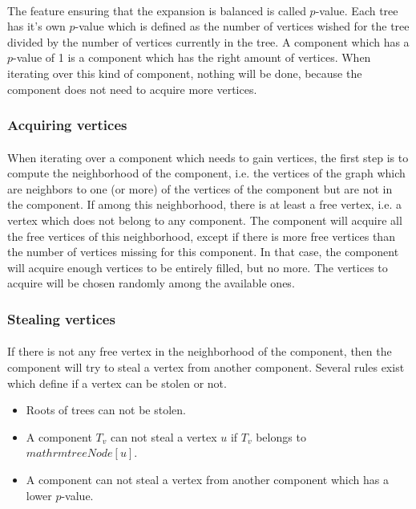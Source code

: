 \paragraph{}
The feature ensuring that the expansion is balanced is called $p$-value. Each
tree has it's own $p$-value which is defined as the number of vertices wished
for the tree divided by the number of vertices currently in the tree. A
component which has a $p$-value of 1 is a component which has the right amount
of vertices. When iterating over this kind of component, nothing will be done,
because the component does not need to acquire more vertices.

\subsubsection{Acquiring vertices}
\paragraph{}
When iterating over a component which needs to gain vertices, the first step
is to compute the neighborhood of the component, i.e. the vertices of the
graph which are neighbors to one (or more) of the vertices of the component
but are not in the component. If among this neighborhood, there is at least a
free vertex, i.e. a vertex which does not belong to any component. The
component will acquire all the free vertices of this neighborhood, except if
there is more free vertices than the number of vertices missing for this
component. In that case, the component will acquire enough vertices to be
entirely filled, but no more. The vertices to acquire will be chosen randomly
among the available ones.

\subsubsection{Stealing vertices}
\paragraph{}
If there is not any free vertex in the neighborhood of the component, then the
component will try to steal a vertex from another component. Several rules
exist which define if a vertex can be stolen or not.
\begin{itemize}
\item Roots of trees can not be stolen.
\item A component $T_v$ can not steal a vertex $u$ if $T_v$ belongs to
  $mathrm{treeNode}[u]$.
\item A component can not steal a vertex from another component which has a
  lower $p$-value.
\end{itemize}

